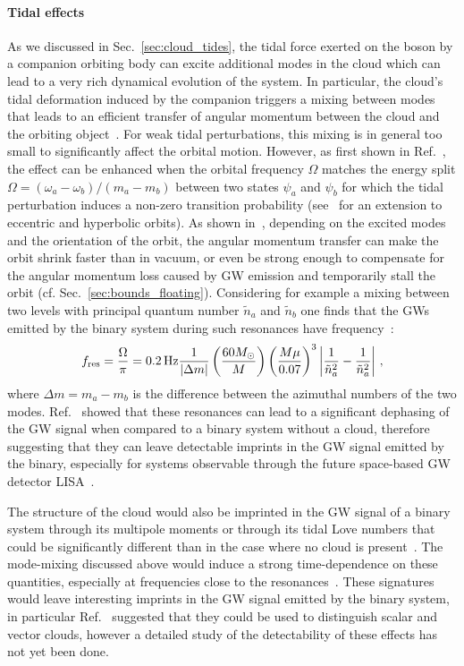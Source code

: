 \documentclass[11pt]{article}
\numberwithin{equation}{section} %
\begin{document}
\paragraph{Tidal effects} 
As we discussed in Sec.~\ref{sec:cloud_tides}, the tidal force exerted on the boson by a companion orbiting body can excite additional modes in the cloud which can lead to a very rich dynamical evolution of the system. In particular, the cloud's tidal deformation induced by the companion triggers a mixing between modes that leads to an efficient transfer of angular momentum between the cloud and the orbiting object~\cite{Zhang:2018kib,Baumann:2019ztm}. For weak tidal perturbations, this mixing is in general too small to significantly affect the orbital motion. However, as first shown in Ref.~\cite{Baumann:2018vus}, the effect can be enhanced when the orbital frequency $\Omega$ matches the energy split $\Omega=(\omega_a-\omega_b)/(m_a-m_b)$ between two states $\psi_a$ and $\psi_b$ for which the tidal perturbation induces a non-zero transition probability (see~\cite{Berti:2019wnn,Zhang:2019eid} for an extension to eccentric and hyperbolic orbits). As shown in~\cite{Zhang:2018kib,Baumann:2018vus}, depending on the excited modes and the orientation of the orbit, the angular momentum transfer can make the orbit shrink faster than in vacuum, or even be strong enough to compensate for the angular momentum loss caused by GW emission and temporarily stall the orbit (cf. Sec.~\ref{sec:bounds_floating}). Considering for example a mixing between two levels with principal quantum number $\tilde{n}_{a}$ and $\tilde{n}_{b}$ one finds that the GWs emitted by the binary system during such resonances have frequency~\cite{Baumann:2018vus,Zhang:2018kib,Baumann:2019ztm}:
%
\begin{equation}
f_{\rm res}=\frac{\Omega}{\pi}=0.2\,{\rm Hz}\frac{1}{|\Delta m|}\left(\frac{60 M_{\odot}}{M}\right)\left(\frac{M\mu}{0.07}\right)^3\left|\frac{1}{\tilde{n}_a^2}-\frac{1}{\tilde{n}_a^2}\right|\,,
\end{equation}
%
where $\Delta m=m_a-m_b$ is the difference between the azimuthal numbers of the two modes. Ref.~\cite{Baumann:2019ztm} showed that these resonances can lead to a significant dephasing of the GW signal when compared to a binary system without a cloud, therefore suggesting that they can leave detectable imprints in the GW signal emitted by the binary, especially for systems observable through the future space-based GW detector LISA~\cite{Audley:2017drz}.

The structure of the cloud would also be imprinted in the GW signal of a binary system through its multipole moments or through its tidal Love numbers that could be significantly different than in the case where no cloud is present~\cite{Baumann:2018vus,Baumann:2019ztm}.
The mode-mixing discussed above would induce a strong time-dependence on these quantities, especially at frequencies close to the resonances~\cite{Baumann:2018vus,Baumann:2019ztm}. These signatures would leave interesting imprints in the GW signal emitted by the binary system, in particular Ref.~\cite{Baumann:2019ztm} suggested that they could be used to distinguish scalar and vector clouds, however a detailed study of the  detectability of these effects has not yet been done. 
\end{document}
